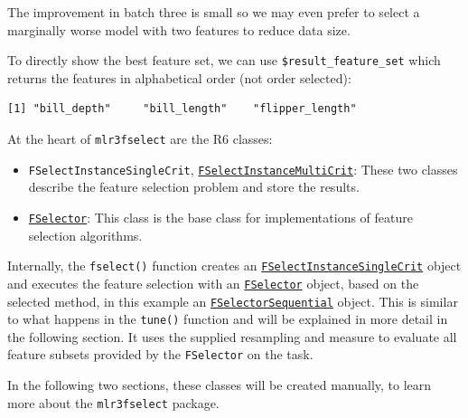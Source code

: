 The improvement in batch three is small so we may even prefer to select
a marginally worse model with two features to reduce data size.

To directly show the best feature set, we can use
\texttt{\$result\_feature\_set} which returns the features in
alphabetical order (not order selected):

\begin{Shaded}
\begin{Highlighting}[]
\SpecialCharTok{$}
\end{Highlighting}
\end{Shaded}

\begin{verbatim}
[1] "bill_depth"     "bill_length"    "flipper_length"
\end{verbatim}

At the heart of \texttt{mlr3fselect} are the R6 classes:

\begin{itemize}
\tightlist
\item
  \texttt{FSelectInstanceSingleCrit},
  \href{https://mlr3fselect.mlr-org.com/reference/FSelectInstanceMultiCrit.html}{\texttt{FSelectInstanceMultiCrit}}:
  These two classes describe the feature selection problem and store the
  results.
\item
  \href{https://mlr3fselect.mlr-org.com/reference/FSelector.html}{\texttt{FSelector}}:
  This class is the base class for implementations of feature selection
  algorithms.
\end{itemize}

Internally, the \texttt{fselect()} function creates an
\href{https://mlr3fselect.mlr-org.com/reference/FSelectInstanceSingleCrit.html}{\texttt{FSelectInstanceSingleCrit}}
object and executes the feature selection with an
\href{https://mlr3fselect.mlr-org.com/reference/FSelector.html}{\texttt{FSelector}}
object, based on the selected method, in this example an
\href{https://mlr3fselect.mlr-org.com/reference/mlr_fselectors_sequential.html}{\texttt{FSelectorSequential}}
object. This is similar to what happens in the \texttt{tune()} function
and will be explained in more detail in the following section. It uses
the supplied resampling and measure to evaluate all feature subsets
provided by the \texttt{FSelector} on the task.

In the following two sections, these classes will be created manually,
to learn more about the \texttt{mlr3fselect} package.

